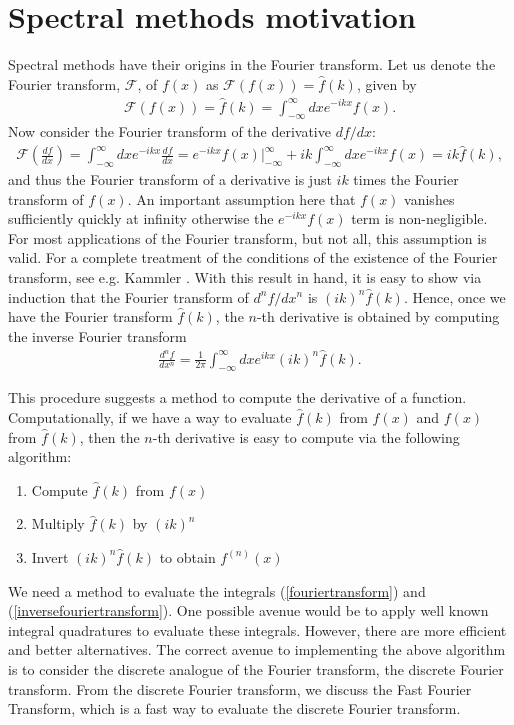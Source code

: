 \section{Spectral methods motivation}
Spectral methods have their origins in the Fourier transform. Let us denote the Fourier transform, $\mathcal{F}$, of $f(x)$ as $\mathcal{F}(f(x)) = \hat{f}(k)$, given by
\begin{align}
\mathcal{F}(f(x)) = \hat{f}(k) = \int_{-\infty}^{\infty}dxe^{-ikx}f(x)\label{fouriertransform}.
\end{align}
Now consider the Fourier transform of the derivative $df/dx$: 
\begin{align} 
\mathcal{F}\left(\frac{df}{dx}\right)= \int_{-\infty}^{\infty}dxe^{-ikx}\frac{df}{dx}=e^{-ikx}f(x)\bigg|_{-\infty}^{\infty} + ik\int_{-\infty}^{\infty}dxe^{-ikx}f(x)= ik\hat{f}(k),
\end{align}
and thus the Fourier transform of a derivative is just $ik$ times the Fourier transform of $f(x)$. An important assumption here that $f(x)$ vanishes sufficiently quickly at infinity otherwise the $e^{-ikx}f(x)$ term is non-negligible. For most applications of the Fourier transform, but not all, this assumption is valid. For a complete treatment of the conditions of the existence of the Fourier transform, see e.g. Kammler \cite{kammler}. With this result in hand, it is easy to show via induction that the Fourier transform of $d^{n}f/dx^{n}$ is $(ik)^{n}\hat{f}(k)$. Hence, once we have the Fourier transform $\hat{f}(k)$, the $n$-th derivative is obtained by computing the inverse Fourier transform
\begin{align}
\frac{d^{n}f}{dx^{n}} = \frac{1}{2\pi} \int_{-\infty}^{\infty}dx e^{ikx}(ik)^{n}\hat{f}(k).\label{inversefouriertransform}
\end{align}

This procedure suggests a method to compute the derivative of a function. Computationally, if we have a way to evaluate $\hat{f}(k)$ from $f(x)$ and $f(x)$ from $\hat{f}(k)$, then the $n$-th derivative is easy to compute via the following algorithm:  
\begin{enumerate} 
\item Compute $\hat{f}(k)$ from $f(x)$
\item Multiply $\hat{f}(k)$ by $(ik)^{n}$ 
\item Invert $(ik)^{n}\hat{f}(k)$ to obtain $f^{(n)}(x)$
\end{enumerate}

We need a method to evaluate the integrals (\ref{fouriertransform}) and (\ref{inversefouriertransform}). One possible avenue would be to apply well known integral quadratures to evaluate these integrals. However, there are more efficient and better alternatives. The correct avenue to implementing the above algorithm is to consider the discrete analogue of the Fourier transform, the discrete Fourier transform. From the discrete Fourier transform, we discuss the Fast Fourier Transform, which is a fast way to evaluate the discrete Fourier transform.
